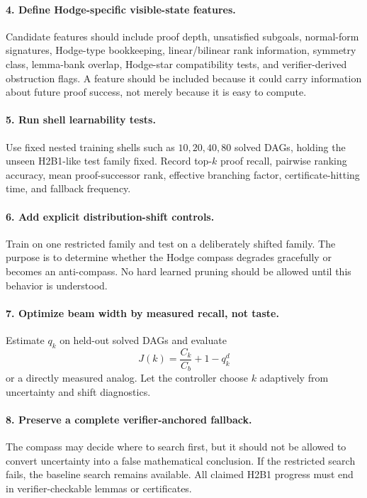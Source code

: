 \documentclass[11pt]{article}
\begin{document}
\paragraph{4. Define Hodge-specific visible-state features.}
Candidate features should include proof depth, unsatisfied subgoals, normal-form signatures, Hodge-type bookkeeping, linear/bilinear rank information, symmetry class, lemma-bank overlap, Hodge-star compatibility tests, and verifier-derived obstruction flags. A feature should be included because it could carry information about future proof success, not merely because it is easy to compute.

\paragraph{5. Run shell learnability tests.}
Use fixed nested training shells such as \(10,20,40,80\) solved DAGs, holding the unseen H2B1-like test family fixed. Record top-\(k\) proof recall, pairwise ranking accuracy, mean proof-successor rank, effective branching factor, certificate-hitting time, and fallback frequency.

\paragraph{6. Add explicit distribution-shift controls.}
Train on one restricted family and test on a deliberately shifted family. The purpose is to determine whether the Hodge compass degrades gracefully or becomes an anti-compass. No hard learned pruning should be allowed until this behavior is understood.

\paragraph{7. Optimize beam width by measured recall, not taste.}
Estimate \(q_k\) on held-out solved DAGs and evaluate
\[
J(k)=\frac{C_k}{C_b}+1-q_k^d
\]
or a directly measured analog. Let the controller choose \(k\) adaptively from uncertainty and shift diagnostics.

\paragraph{8. Preserve a complete verifier-anchored fallback.}
The compass may decide where to search first, but it should not be allowed to convert uncertainty into a false mathematical conclusion. If the restricted search fails, the baseline search remains available. All claimed H2B1 progress must end in verifier-checkable lemmas or certificates.
\end{document}
